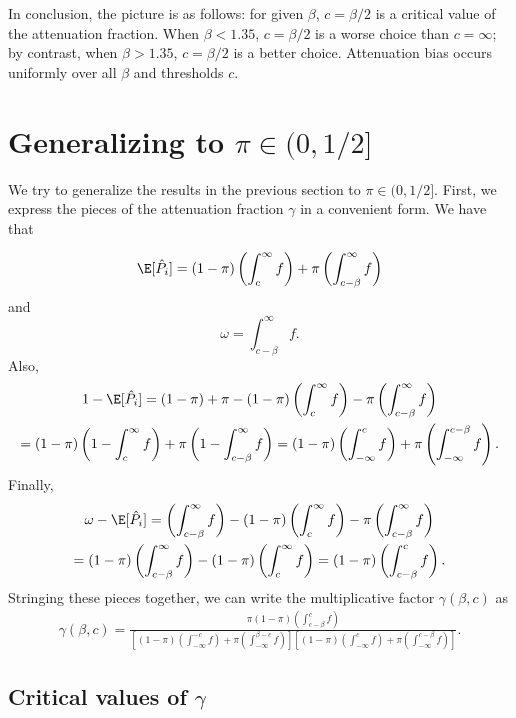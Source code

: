 \documentclass[12pt]{article}
\begin{document}
In conclusion, the picture is as follows: for given $\beta$, $c = \beta/2$ is a critical value of the attenuation fraction. When $\beta < 1.35$, $c = \beta/2$ is a worse choice than $c = \infty$; by contrast, when $\beta > 1.35$, $c = \beta/2$ is a better choice. Attenuation bias occurs uniformly over all $\beta$ and thresholds $c$.

\section{Generalizing to $\pi \in (0,1/2]$}
We try to generalize the results in the previous section to $\pi \in (0, 1/2]$. First, we express the pieces of the attenuation fraction $\gamma$ in a convenient form. We have that

$$ \E [ \hat{P}_i] = (1-\pi)  \left( \int_{c}^\infty f \right)+ \pi \left( \int_{c - \beta}^\infty f\right)$$ and 
$$\omega = \int_{c - \beta}^\infty f.$$
Also,
\begin{multline*}
1 - \E[\hat{P}_i]  = (1 - \pi) + \pi - (1-\pi) \left(\int_{c}^\infty f\right) - \pi \left( \int_{c - \beta}^\infty f \right) \\ = (1 -\pi)\left( 1 - \int_{c}^\infty f \right) + \pi \left( 1 - \int_{c - \beta}^\infty f \right) = (1 - \pi) \left( \int_{-\infty}^c f \right) + \pi \left( \int_{-\infty}^{c- \beta} f \right).
\end{multline*}
Finally,
\begin{multline*}
\omega - \E[\hat{P}_i] = \left(\int_{c - \beta}^\infty f \right) - (1-\pi) \left(\int_{c}^\infty f \right)- \pi \left(\int_{c - \beta}^\infty f \right) \\ = (1 - \pi) \left( \int_{c - \beta}^\infty f \right) - (1 - \pi)\left( \int_{c}^\infty f \right) = (1 - \pi) \left( \int_{c - \beta}^{c} f \right).
\end{multline*}
Stringing these pieces together, we can write the multiplicative factor $\gamma(\beta,c)$ as 
\begin{multline*}
\gamma(\beta, c) = \frac{ \pi (1-\pi) \left( \int_{c-\beta}^c f \right) }{  \left[ (1-\pi)  \left( \int_{-\infty}^{-c} f \right)+ \pi \left( \int_{-\infty}^{\beta - c} f\right) \right] \left[  (1 - \pi) \left( \int_{-\infty}^c f \right) + \pi \left( \int_{-\infty}^{c- \beta} f\right)  \right]}.
\end{multline*}

\subsection{Critical values of $\gamma$}
\end{document}
